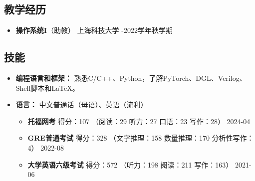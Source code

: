 \documentclass[a4paper,10pt]{ctexart} %
\begin{document}

\begin{keepsection}
\subsection{教学经历}

    \begin{itemize}
        \item \textbf{操作系统I}（助教） \hfill 上海科技大学 -2022学年秋学期
    \end{itemize}
\end{keepsection}



\begin{keepsection}

\section{技能}
\begin{itemize}
    \item \textbf{编程语言和框架：} 熟悉C/C++、Python，了解PyTorch、DGL、Verilog、Shell脚本和\LaTeX。
    \item \textbf{语言：} 中文普通话（母语）、英语（流利）
        \begin{itemize}
            \item \textbf{托福网考} \quad 得分：107 {\small （阅读：29 \quad 听力：27 \quad 口语：23 \quad 写作：28）} \hfill 2024-04
            \item \textbf{GRE普通考试} \quad 得分：328 {\small （文字推理：158 \quad 数量推理：170 \quad 分析性写作：4）} \hfill 2022-08
            \item \textbf{大学英语六级考试} \quad 得分：572 {\small （听力：198 \quad 阅读：211 \quad 写作：163）} \hfill 2021-06
        \end{itemize}
\end{itemize}

\end{keepsection}
\end{document}
